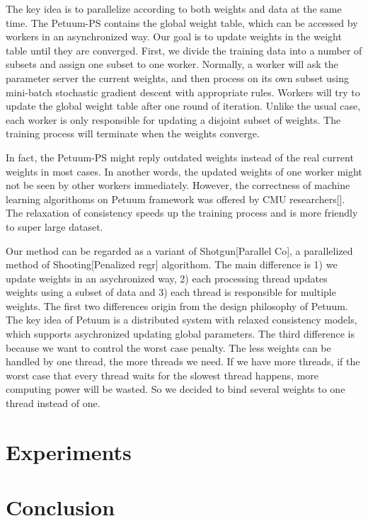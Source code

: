 \documentclass{article} %
\begin{document}
The key idea is to parallelize according to both weights and data at the same time. The Petuum-PS contains the global weight table, which can be accessed by workers in an asynchronized way. Our goal is to update weights in the weight table until they are converged. First, we divide the training data into a number of subsets and assign one subset to one worker. Normally, a worker will ask the parameter server the current weights, and then process on its own subset using mini-batch stochastic gradient descent with appropriate rules. Workers will try to update the global weight table after one round of iteration. Unlike the usual case, each worker is only responsible for updating a disjoint subset of weights. The training process will terminate when the weights converge.

In fact, the Petuum-PS might reply outdated weights instead of the real current weights in most cases. In another words, the updated weights of one worker might not be seen by other workers immediately. However, the correctness of machine learning algorithoms on Petuum framework was offered by CMU researchers[]. The relaxation of consistency speeds up the training process and is more friendly to super large dataset.

Our method can be regarded as a variant of Shotgun[Parallel Co], a parallelized method of Shooting[Penalized regr] algorithom. The main difference is 1) we update weights in an asychronized way, 2) each processing thread updates weights using a subset of data and 3) each thread is responsible for multiple weights. The first two differences origin from the design philosophy of Petuum. The key idea of Petuum is a distributed system with relaxed consistency models, which supports asychronized updating global parameters. The third difference is because we want to control the worst case penalty. The less weights can be handled by one thread, the more threads we need. If we have more threads, if the worst case that every thread waits for the slowest thread happens, more computing power will be wasted. So we decided to bind several weights to one thread instead of one. 
 
\section{Experiments}
\label{others}

\section{Conclusion}
\end{document}
